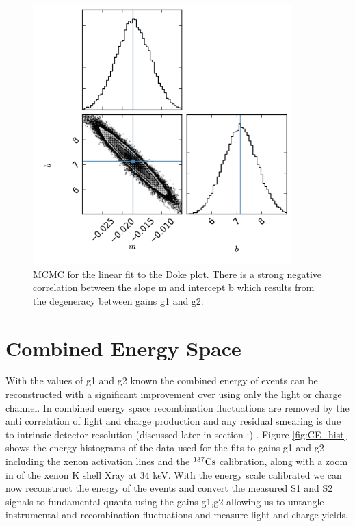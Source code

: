 \begin{figure}[h!]\centering
\includegraphics[width=100mm]{Chapter_E_Scale/Figures/MCMC/triangle.png} %
\caption{MCMC for the linear fit to the Doke plot. There is a strong negative correlation between the slope m and intercept b which results from the degeneracy between gains g1 and g2. }
\label{fig:MCMC} 
\end{figure}

\newpage

\section{Combined Energy Space}

With the values of g1 and g2 known the combined energy of events can be reconstructed with a significant improvement over using only the light or charge channel. In combined energy space recombination fluctuations are removed by the anti correlation of light and charge production and any residual smearing is due to intrinsic detector resolution (discussed later in section :) . Figure \ref{fig:CE_hist} shows the energy histograms of the data used for the fits to gains g1 and g2 including the xenon activation lines and the $\rm^{137}Cs$ calibration, along with a zoom in of the xenon K shell Xray at 34 keV. With the energy scale calibrated we can now reconstruct the energy of the events and convert the measured S1 and S2 signals to fundamental quanta using  the gains g1,g2 allowing us to untangle instrumental and recombination fluctuations and measure light and charge yields.


